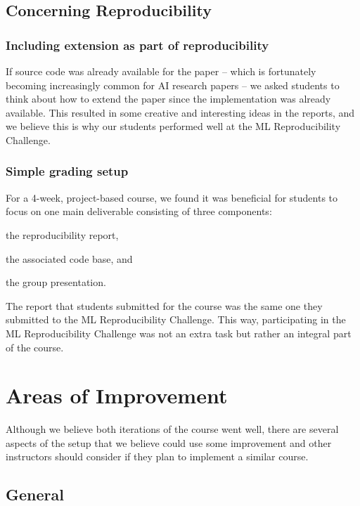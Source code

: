 \subsection{Concerning Reproducibility}

\subsubsection{Including extension as part of reproducibility}
If source code was already available for the paper -- which is fortunately becoming increasingly common for AI research papers -- we asked students to think about how to extend the paper since the implementation was already available. This resulted in some creative and interesting ideas in the reports, and we believe this is why our students performed well at the ML Reproducibility Challenge.

\subsubsection{Simple grading setup}
For a 4-week, project-based course, we found it was beneficial for students to focus on one main deliverable consisting of three components: 
\begin{enumerate*}[label=(\roman*)]
\item the reproducibility report, 
\item the associated code base, and
\item the group presentation. 
\end{enumerate*}
The report that students submitted for the course was the same one they submitted to the ML Reproducibility Challenge. This way, participating in the ML Reproducibility Challenge was not an extra task but rather an integral part of the course. 


\section{Areas of Improvement}
\label{section:whatdidnt}


Although we believe both iterations of the course went well, there are several aspects of the setup that we believe could use some improvement and other instructors should consider if they plan to implement a similar course. 

\subsection{General}

